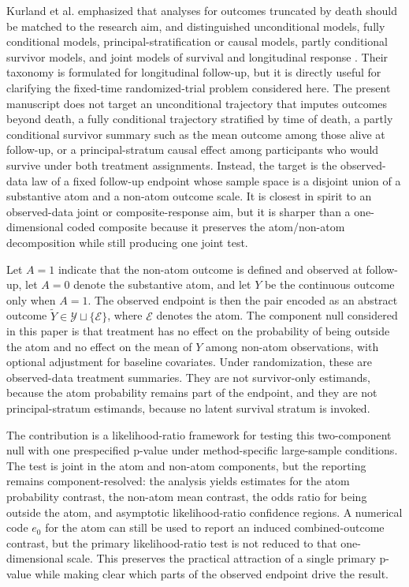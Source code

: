 \documentclass[11pt]{article}
\begin{document}
Kurland et al. emphasized that analyses for outcomes truncated by death should be matched to the research aim, and distinguished unconditional models, fully conditional models, principal-stratification or causal models, partly conditional survivor models, and joint models of survival and longitudinal response \citep{Kurland_2009}. Their taxonomy is formulated for longitudinal follow-up, but it is directly useful for clarifying the fixed-time randomized-trial problem considered here. The present manuscript does not target an unconditional trajectory that imputes outcomes beyond death, a fully conditional trajectory stratified by time of death, a partly conditional survivor summary such as the mean outcome among those alive at follow-up, or a principal-stratum causal effect among participants who would survive under both treatment assignments. Instead, the target is the observed-data law of a fixed follow-up endpoint whose sample space is a disjoint union of a substantive atom and a non-atom outcome scale. It is closest in spirit to an observed-data joint or composite-response aim, but it is sharper than a one-dimensional coded composite because it preserves the atom/non-atom decomposition while still producing one joint test.

Let $A=1$ indicate that the non-atom outcome is defined and observed at follow-up, let $A=0$ denote the substantive atom, and let $Y$ be the continuous outcome only when $A=1$. The observed endpoint is then the pair encoded as an abstract outcome $\widetilde{Y}\in\mathcal{Y}\sqcup\{\mathcal{E}\}$, where $\mathcal{E}$ denotes the atom. The component null considered in this paper is that treatment has no effect on the probability of being outside the atom and no effect on the mean of $Y$ among non-atom observations, with optional adjustment for baseline covariates. Under randomization, these are observed-data treatment summaries. They are not survivor-only estimands, because the atom probability remains part of the endpoint, and they are not principal-stratum estimands, because no latent survival stratum is invoked.

The contribution is a likelihood-ratio framework for testing this two-component null with one prespecified p-value under method-specific large-sample conditions. The test is joint in the atom and non-atom components, but the reporting remains component-resolved: the analysis yields estimates for the atom probability contrast, the non-atom mean contrast, the odds ratio for being outside the atom, and asymptotic likelihood-ratio confidence regions. A numerical code $e_0$ for the atom can still be used to report an induced combined-outcome contrast, but the primary likelihood-ratio test is not reduced to that one-dimensional scale. This preserves the practical attraction of a single primary p-value while making clear which parts of the observed endpoint drive the result.
\end{document}
